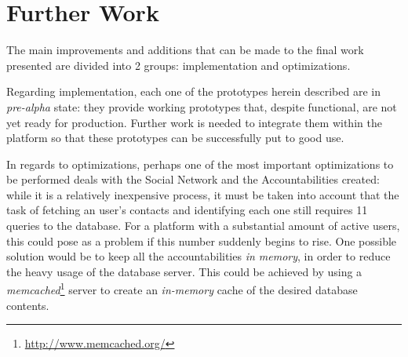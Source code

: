 \section{Further Work}\label{sec:further_work}

The main improvements and additions that can be made to the final work presented are divided into 2 groups: implementation and optimizations.

Regarding implementation, each one of the prototypes herein described are in \textit{pre-alpha} state: they provide working prototypes that, despite functional, are not yet ready for production. Further work is needed to integrate them within the platform so that these prototypes can be successfully put to good use.

In regards to optimizations, perhaps one of the most important optimizations to be performed deals with the Social Network and the Accountabilities created: while it is a relatively inexpensive process, it must be taken into account that the task of fetching an user's contacts and identifying each one still requires 11 queries to the database. For a platform with a substantial amount of active users, this could pose as a problem if this number suddenly begins to rise. One possible solution would be to keep all the accountabilities \emph{in memory}, in order to reduce the heavy usage of the database server. This could be achieved by using a \emph{memcached}\footnote{\url{http://www.memcached.org/}} server to create an \emph{in-memory} cache of the desired database contents.

